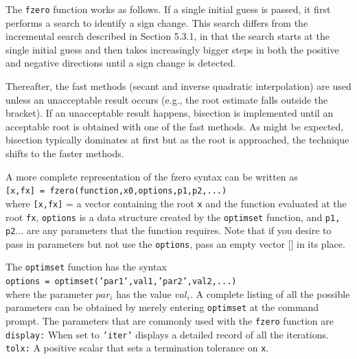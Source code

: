 \documentclass[../main.tex]{subfiles}
\begin{document}
\noindent The \texttt{fzero} function works as follows. If a single initial guess is passed, it first performs
a search to identify a sign change. This search differs from the incremental search described
in Section 5.3.1, in that the search starts at the single initial guess and then takes increasingly
bigger steps in both the positive and negative directions until a sign change is detected.

Thereafter, the fast methods (secant and inverse quadratic interpolation) are used unless
an unacceptable result occurs (e.g., the root estimate falls outside the bracket). If an
unacceptable result happens, bisection is implemented until an acceptable root is obtained
with one of the fast methods. As might be expected, bisection typically dominates at first
but as the root is approached, the technique shifts to the faster methods.

A more complete representation of the fzero syntax can be written as\\

\texttt{[x,fx] = fzero(function,x0,options,p1,p2,...)}\\

\noindent where \texttt{[x,fx]} = a vector containing the root \texttt{x} and the function evaluated at the root \texttt{fx},
\texttt{options} is a data structure created by the \texttt{optimset} function, and \texttt{p1, p2}... are any
parameters that the function requires. Note that if you desire to pass in parameters but not
use the \texttt{options}, pass an empty vector [] in its place.

The \texttt{optimset} function has the syntax\\

\texttt{options = optimset('par1',val1,'par2',val2,...)}\\

\noindent where the parameter \texttt{$par_i$} has the value \texttt{$val_i$}. A complete listing of all the possible parameters
can be obtained by merely entering \texttt{optimset} at the command prompt. The parameters
that are commonly used with the \texttt{fzero} function are\\

\texttt{display:} When set to \texttt{'iter'} displays a detailed record of all the iterations.\\
\texttt{tolx:} A positive scalar that sets a termination tolerance on \texttt{x}.
\end{document}
